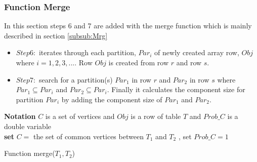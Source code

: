 \documentclass[12pt]{article}
\begin{document}
\subsubsection{Function Merge}
In this section steps 6 and 7 are added with the merge function which is mainly described in section \ref{subsub:Mrg}
\begin{itemize}[noitemsep]
\item $Step 6:$ iterates through each partition, $Par_i$ of newly created array row, $Obj$ where $i=1,2,3,...$. Row $Obj$ is created from row $r$ and row $s$.
\item $Step 7:$ search for a partition(s) $Par_1$ in row $r$ and $Par_2$ in row $s$ where $Par_1\subseteq Par_i$ and  $Par_2\subseteq Par_i$. Finally it calculates the component size for partition $Par_i$  by adding the component size of $Par_1$ and $Par_2$.
\end{itemize}

\begin{algorithm}[H]

\Indm  
{}

\textbf{Notation} $C$ is a set of vertices and $Obj$ is a row of table $T$ and $Prob\_C$ is a double variable\\
\Indp
\nl \textbf{set} $C=$ the set of common vertices between $T_1$ and $T_2$ , set $Prob\_C=1$\\
 \nl {}
\nl {}

 \caption{Function merge($T_1,T_2$)}
\end{algorithm}
\end{document}
